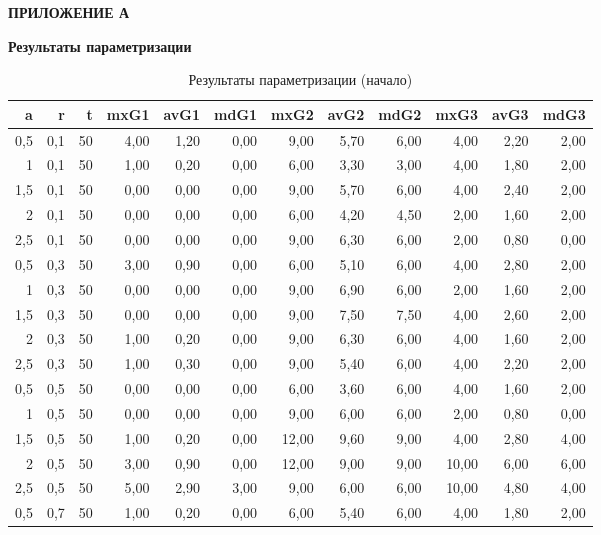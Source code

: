 \begin{center}
    \textbf{ПРИЛОЖЕНИЕ А}
\end{center}
\begin{center}
    \textbf{Результаты параметризации}
\end{center}


\begin{table}[h]
\centering
\caption{Результаты параметризации (начало)}
\begin{tabular}{|r|r|r|r|r|r|r|r|r|r|r|r|}
\hline
a & r & t & mxG1 & avG1 & mdG1 & mxG2 & avG2 & mdG2 & mxG3 & avG3 & mdG3 \\
\hline
0,5 & 0,1 & 50 & 4,00 & 1,20 & 0,00 & 9,00 & 5,70 & 6,00 & 4,00 & 2,20 & 2,00 \\
1 & 0,1 & 50 & 1,00 & 0,20 & 0,00 & 6,00 & 3,30 & 3,00 & 4,00 & 1,80 & 2,00 \\
1,5 & 0,1 & 50 & 0,00 & 0,00 & 0,00 & 9,00 & 5,70 & 6,00 & 4,00 & 2,40 & 2,00 \\
2 & 0,1 & 50 & 0,00 & 0,00 & 0,00 & 6,00 & 4,20 & 4,50 & 2,00 & 1,60 & 2,00 \\
2,5 & 0,1 & 50 & 0,00 & 0,00 & 0,00 & 9,00 & 6,30 & 6,00 & 2,00 & 0,80 & 0,00 \\
0,5 & 0,3 & 50 & 3,00 & 0,90 & 0,00 & 6,00 & 5,10 & 6,00 & 4,00 & 2,80 & 2,00 \\
1 & 0,3 & 50 & 0,00 & 0,00 & 0,00 & 9,00 & 6,90 & 6,00 & 2,00 & 1,60 & 2,00 \\
1,5 & 0,3 & 50 & 0,00 & 0,00 & 0,00 & 9,00 & 7,50 & 7,50 & 4,00 & 2,60 & 2,00 \\
2 & 0,3 & 50 & 1,00 & 0,20 & 0,00 & 9,00 & 6,30 & 6,00 & 4,00 & 1,60 & 2,00 \\
2,5 & 0,3 & 50 & 1,00 & 0,30 & 0,00 & 9,00 & 5,40 & 6,00 & 4,00 & 2,20 & 2,00 \\
0,5 & 0,5 & 50 & 0,00 & 0,00 & 0,00 & 6,00 & 3,60 & 6,00 & 4,00 & 1,60 & 2,00 \\
1 & 0,5 & 50 & 0,00 & 0,00 & 0,00 & 9,00 & 6,00 & 6,00 & 2,00 & 0,80 & 0,00 \\
1,5 & 0,5 & 50 & 1,00 & 0,20 & 0,00 & 12,00 & 9,60 & 9,00 & 4,00 & 2,80 & 4,00 \\
2 & 0,5 & 50 & 3,00 & 0,90 & 0,00 & 12,00 & 9,00 & 9,00 & 10,00 & 6,00 & 6,00 \\
2,5 & 0,5 & 50 & 5,00 & 2,90 & 3,00 & 9,00 & 6,00 & 6,00 & 10,00 & 4,80 & 4,00 \\
0,5 & 0,7 & 50 & 1,00 & 0,20 & 0,00 & 6,00 & 5,40 & 6,00 & 4,00 & 1,80 & 2,00 \\

\end{tabular}
\end{table}
